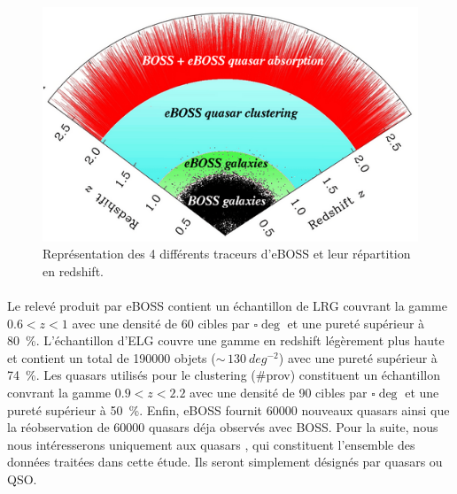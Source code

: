 \documentclass[11pt, twoside, a4paper, openright]{report}
\begin{document}
\begin{figure}
  \centering
  \includegraphics[scale=0.5]{eBOSStracers}
  \caption{Représentation des 4 différents traceurs d'eBOSS et leur r\'epartition en redshift.}
  \label{fig:eBOSStracers}
\end{figure}
\paragraph{}
Le relevé produit par eBOSS contient un échantillon de LRG couvrant la gamme $\num{0,6} < z < \num{1}$ avec une densité de 60 cibles par $\si{\square\deg}$ et une pureté supérieur à \SI{80}{\percent}. L'échantillon d'ELG couvre une gamme en redshift légèrement plus haute et contient un total de \num{190000} objets ($\sim\,\SI{130}{deg^{-2}}$) avec une pureté supérieur à \SI{74}{\percent}. Les quasars utilisés pour le clustering (\#prov) constituent un échantillon convrant la gamme $\num{0,9} < z < \num{2,2}$ avec une densité de 90 cibles par $\si{\square\deg}$ et une pureté supérieur à \SI{50}{\percent}. Enfin, eBOSS fournit \num{60000} nouveaux quasars \lya{} ainsi que la réobservation de \num{60000} quasars \lya{} déja observés avec BOSS. Pour la suite, nous nous intéresserons uniquement aux quasars \lya{}, qui constituent l'ensemble des données traitées dans cette étude. Ils seront simplement désignés par quasars ou QSO.


\end{document}
